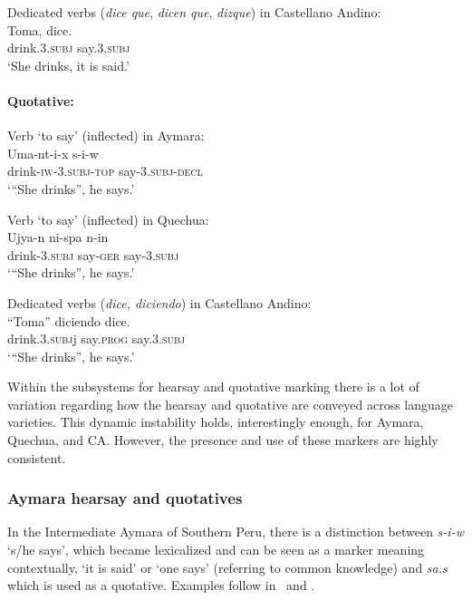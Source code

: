 \documentclass[output=paper,hidelinks]{langscibook}
\begin{document}
\ea \label{ex:hearsay.CA}
 {Dedicated verbs (\textit{dice que}, \textit{dicen que}, \textit{dizque}) in Castellano Andino:} \\
\gll Toma, dice. \\
drink.3.\textsc{subj} say.3.\textsc{subj}\\
\glt ‘She drinks, it is said.’ 
\z

\paragraph*{Quotative:}

\ea \label{ex:quotative.Ay}
 {Verb `to say' (inflected) in Aymara:} \\
\gll Uma-nt-i-x s-i-w \\
drink-\textsc{iw-3.subj-top} say-\textsc{3.subj-decl}\\
\glt `“She drinks'', he says.'
\z



\ea \label{ex:quotative.Qu}
 {Verb `to say' (inflected) in Quechua:} \\
\gll Ujya-n ni-spa n-in\\
drink-\textsc{3.subj} say-\textsc{ger} say-\textsc{3.subj}\\
\glt `“She drinks”, he says.’
\z

\ea \label{ex:quotative.CA}
 {Dedicated verbs (\textit{dice, diciendo}) in Castellano Andino:} \\
\gll “Toma” diciendo dice. \\
drink.\textsc{3.subj}j say.\textsc{prog} say.\textsc{3.subj}\\
\glt `“She drinks”, he says.’
\z

Within the subsystems for hearsay and quotative marking there is a lot of variation regarding how the hearsay and quotative are conveyed across language varieties. This dynamic instability holds, interestingly enough, for Aymara, Quechua, and CA. However, the presence and use of these markers are highly consistent. 

\subsubsection{Aymara hearsay and quotatives}
In the Intermediate Aymara of Southern Peru, there is a distinction between \textit{s-i-w} `s/he says', which became lexicalized and can be seen as a marker meaning contextually, `it is said' or `one says' (referring to common knowledge) and \textit{sa.s} which is used as a quotative. Examples follow in~ and .
\end{document}
